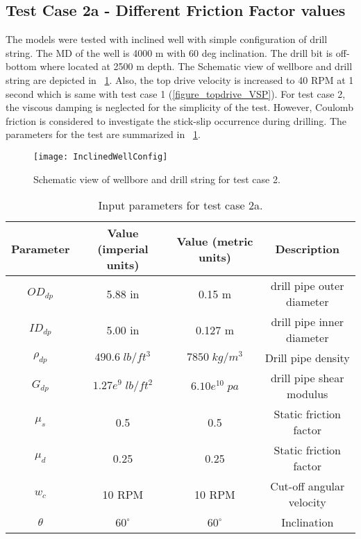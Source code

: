 \subsection{Test Case 2a - Different Friction Factor values}

The models were tested with inclined well with simple configuration of drill string. The MD of the well is 4000 m with 60 deg inclination. The drill bit is off-bottom where located at 2500 m depth. The Schematic view of wellbore and drill string are depicted in \figurename~\ref{figure_wellconfig_inclined}. Also, the top drive velocity is increased to 40 RPM at 1 second which is same with test case 1 (\figurename\ref{figure_topdrive_VSP}). For test case 2, the viscous damping is neglected for the simplicity of the test. However, Coulomb friction is considered to investigate the stick-slip occurrence during drilling. The parameters for the test are summarized in \tablename~\ref{table_Inclinedwell_2a_input}.

\begin{figure}[!hbt]
  \centering
  \texttt{[image: InclinedWellConfig]}
  \caption[Schematic view of test case 2.]{Schematic view of wellbore and drill string for test case 2.}\label{figure_wellconfig_inclined}
\end{figure}

 \begin{table}[!hbt]
\centering
   \begin{tabular}{|c|c|c|c|}
   \hline
   Parameter & Value (imperial units) & Value (metric units) & Description\\                                                              
   \hline
   $OD_{dp}$ & 5.88 in & 0.15 m & drill pipe outer diameter\\                                                       
   \hline
   $ID_{dp}$ & 5.00 in & 0.127 m & drill pipe inner diameter  \\                                                      
   \hline
   $\rho_{dp}$ & $490.6\;lb/ft^3$ & $7850\;kg/m^3$ & Drill pipe density \\                                                  
   \hline
   $G_{dp}$ & $1.27e^{9}\;lb/ft^2$ & $6.10e^{10}\;pa$ & drill pipe shear modulus\\                                                              
   \hline
   $\mu_{s}$ & 0.5 & 0.5 & Static friction factor\\
   \hline
   $\mu_{d}$ & 0.25 & 0.25 & Static friction factor\\
   \hline
   $w_c$ & 10 RPM & 10 RPM & Cut-off angular velocity\\
   \hline
   $\theta$ & $60^{\circ}$ & $60^{\circ}$ & Inclination\\
   \hline
   \end{tabular}
\caption[Input parameters for test case 2a.]{Input parameters for test case 2a.}\label{table_Inclinedwell_2a_input}
\end{table}


